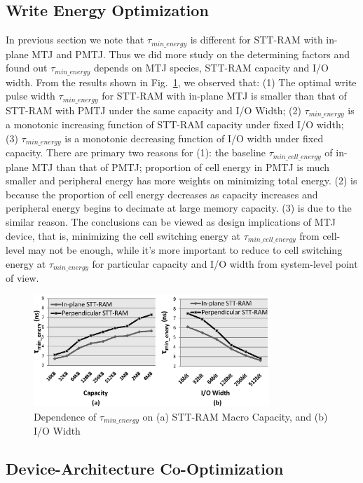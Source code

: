 \subsection{Write Energy Optimization}
In previous section we note that $\tau_{min\_energy}$ is different for STT-RAM with in-plane MTJ and PMTJ. Thus we did more study on the determining factors and found out $\tau_{min\_energy}$ depends on MTJ species, STT-RAM capacity and I/O width. From the results shown in Fig.~\ref{fig:minenergy}, we observed that: (1) The optimal write pulse width $\tau_{min\_energy}$ for STT-RAM with in-plane MTJ is smaller than that of STT-RAM with PMTJ under the same capacity and I/O Width; (2) $\tau_{min\_energy}$ is a monotonic increasing function of STT-RAM capacity under fixed I/O width; (3) $\tau_{min\_energy}$ is a monotonic decreasing function of I/O width under fixed capacity. There are primary two reasons for (1): the baseline $\tau_{min\_cell\_energy}$ of in-plane MTJ than that of PMTJ; proportion of cell energy in PMTJ is much smaller and peripheral energy has more weights on minimizing total energy. (2) is because the proportion of cell energy decreases as capacity increases and peripheral energy begins to decimate at large memory capacity. (3) is due to the similar reason. The conclusions can be viewed as design implications of MTJ device, that is, minimizing the cell switching energy at $\tau_{min\_cell\_energy}$ from cell-level may not be enough, while it's more important to reduce to cell switching energy at $\tau_{min\_energy}$ for particular capacity and I/O width from system-level point of view.

\begin{figure}[t]
  \centering
  \includegraphics[width=3.5in]{fig/MinEnergy.eps}
  \vspace{-10pt}
  \caption{Dependence of $\tau_{min\_energy}$ on (a) STT-RAM Macro Capacity, and (b) I/O Width}
  \label{fig:minenergy}
  \vspace{-15pt}
\end{figure}

\subsection{Device-Architecture Co-Optimization}

